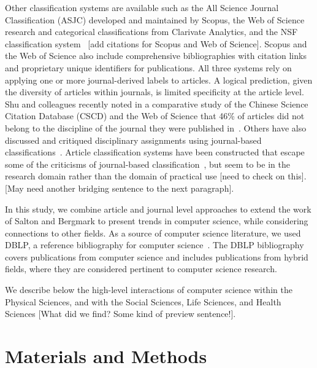 Other classification systems are available such as the All Science Journal Classification (ASJC) developed and maintained by Scopus, the Web of Science research and categorical classifications from Clarivate Analytics, and the NSF classification system~\cite{nsf_classification} [add citations for Scopus and Web of Science]. Scopus and the Web of Science also include comprehensive bibliographies with citation links and proprietary unique identifiers for publications. 
All three systems rely on applying one or more journal-derived labels to articles.  
A logical prediction, given the diversity of articles within journals, is limited specificity at the article level. 
Shu and colleagues recently noted in a comparative study of the Chinese Science Citation Database (CSCD) and the Web of Science that 46\% of articles did not belong to the discipline of the journal they were published in~\cite{shu_comparing_2019}. 
Others have also discussed and critiqued disciplinary assignments using journal-based classifications~\cite{wang_large-scale_2016,perianes-rodriguez_comparison_2017}. 
Article classification systems have been constructed that escape some of the criticisms of journal-based classification~\cite{traag_louvain_2019,boyack_classification_2014,waltman_new_2012}, but seem to be in the research domain rather than the domain of practical use [need to check on this].[May need another bridging sentence to the next paragraph].
 
In this study, we combine article and journal level approaches to extend the work of Salton and Bergmark to present trends in computer science, while considering connections to other fields. As a source of computer science literature, we used DBLP, a reference bibliography for computer science~\cite{dblp_ref}. The DBLP bibliography covers publications from computer science and includes publications from hybrid fields, where they are considered pertinent to computer science research. 

We describe below the high-level interactions of computer science within the Physical Sciences, and with the Social Sciences, Life Sciences, and Health Sciences [What did we find? Some kind of preview sentence!].

\section{Materials and Methods}
\label{sec:methods}


